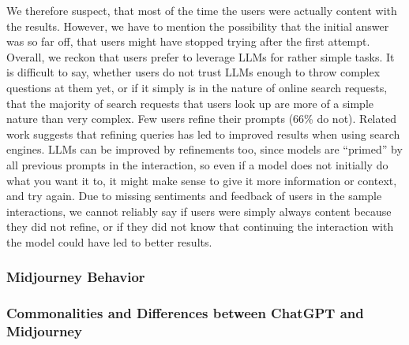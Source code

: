 We therefore suspect, that most of the time the users were actually content with the results.
However, we have to mention the possibility that the initial answer was so far off,
that users might have stopped trying after the first attempt.
Overall, we reckon that users prefer to leverage LLMs for rather simple tasks.
It is difficult to say, whether users do not trust LLMs enough to throw complex questions at
them yet, or if it simply is in the nature of online search requests, that the majority of search
requests that users look up are more of a simple nature than very complex.
Few users refine their prompts (66\% do not).
Related work suggests that refining queries has led to improved results when using search
engines.
LLMs can be improved by refinements too, since models are “primed” by all previous prompts in
the interaction, so even if a model does not initially do what you want it to, it might make
sense to give it more information or context, and try again.
Due to missing sentiments and feedback of users in the sample interactions, we cannot reliably say
if users were simply always content because they did not refine, or if they did not know that
continuing the interaction with the model could have led to better results.

\subsubsection{Midjourney Behavior}

\subsubsection{Commonalities and Differences between ChatGPT and Midjourney}
